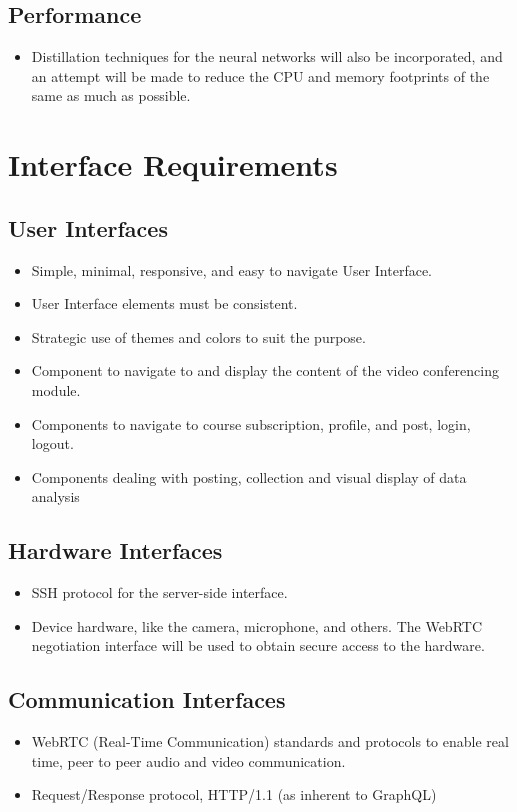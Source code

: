 \subsection{Performance}
\begin{itemize}
    \item Distillation techniques for the neural networks will also be incorporated,
    and an attempt will be made to reduce the CPU and memory footprints of the same as much as possible.
\end{itemize}

\section{Interface Requirements}

\subsection{User Interfaces}
\begin{itemize}
    \item Simple, minimal, responsive, and easy to navigate User Interface.
    \item User Interface elements must be consistent.
    \item Strategic use of themes and colors to suit the purpose.
    \item Component to navigate to and display the content of the video conferencing module.
    \item Components to navigate to course subscription, profile, and post, login, logout.
    \item Components dealing with posting, collection and visual display of data analysis
\end{itemize}

\subsection{Hardware Interfaces}
\begin{itemize}
    \item SSH protocol for the server-side interface.
    \item Device hardware, like the camera, microphone, and others. 
    The WebRTC negotiation interface will be used to obtain secure access to the hardware.
\end{itemize}

\subsection{Communication Interfaces}
\begin{itemize}
    \item WebRTC (Real-Time Communication) standards and protocols to enable real time, peer to peer audio and video communication.
    \item Request/Response protocol, HTTP/1.1 (as inherent to GraphQL)
\end{itemize}

